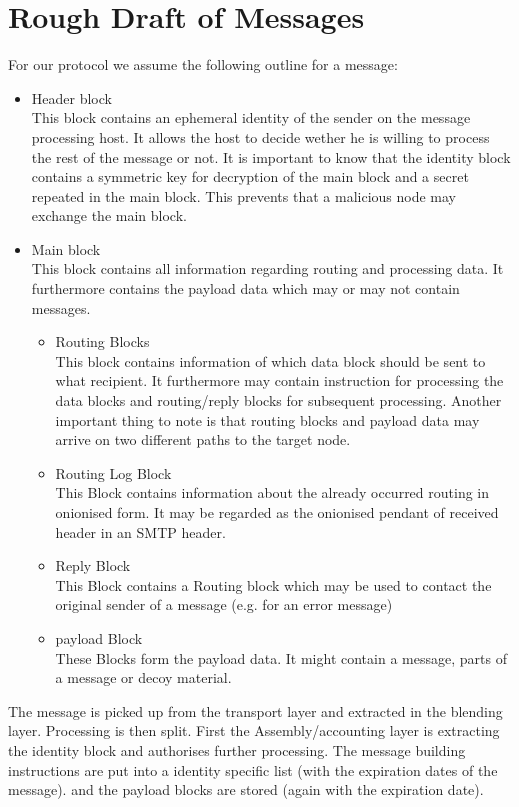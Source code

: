 \section{Rough Draft of Messages}
For our protocol we assume the following outline for a message:
\begin{itemize}
	\item Header block\\ 
	This block contains an ephemeral identity of the sender on the message processing host. It allows the host to decide wether he is willing to process the rest of the message or not. It is important to know that the identity block contains a symmetric key for decryption of the main block and a secret repeated in the main block. This prevents that a malicious node may exchange the main block.
	\item Main block\\
	This block contains all information regarding routing and processing data. It furthermore contains the payload data which may or may not contain messages.
	\begin{itemize}
		\item Routing Blocks\\
		This block contains information of which data block should be sent to what recipient. It furthermore may contain instruction for processing the data blocks and routing/reply blocks for subsequent processing. Another important thing to note is that routing blocks and payload data may arrive on two different paths to the target node.
		\item Routing Log Block\\
		This Block contains information about the already occurred routing in onionised form. It may be regarded as the onionised pendant of received header in an SMTP header.
		\item Reply Block\\
		This Block contains a Routing block which may be used to contact the original sender of a message (e.g. for an error message)
		\item payload Block\\
		These Blocks form the payload data. It might contain a message, parts of a message or decoy material.
	\end{itemize}      
\end{itemize}

The message is picked up from the transport layer and extracted in the blending layer. Processing is then split. First the Assembly/accounting layer is extracting the identity block and authorises further processing. The message building instructions are put into a identity specific list (with the expiration dates of the message). and the payload blocks are stored (again with the expiration date). 

